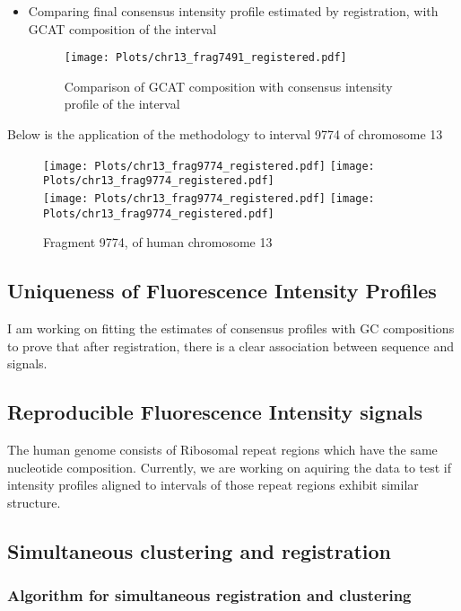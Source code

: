 \begin{itemize}
\item Comparing final consensus intensity profile estimated by registration, with GCAT composition of the interval
\begin{figure}[H]
\begin{center}
\texttt{[image: Plots/chr13\_frag7491\_registered.pdf]}
\end{center}
\caption{Comparison of GCAT composition with consensus intensity profile of the interval}
\label{fig:Frag7491_Compare}
\end{figure}
\end{itemize}

\newpage
Below is the application of the methodology to interval 9774 of chromosome 13
\begin{figure}[H]
\begin{center}
\texttt{[image: Plots/chr13\_frag9774\_registered.pdf]}
\texttt{[image: Plots/chr13\_frag9774\_registered.pdf]} \\
\texttt{[image: Plots/chr13\_frag9774\_registered.pdf]} 
\texttt{[image: Plots/chr13\_frag9774\_registered.pdf]}
\end{center}
\caption{Fragment 9774, of human chromosome 13}
\label{fig:Frag9774_All}
\end{figure}

\subsection{Uniqueness of Fluorescence Intensity Profiles}
\begin{tcolorbox}[colback=red!5,colframe=red!40!black,title=Work in progress] %
I am working on fitting the estimates of consensus profiles with GC compositions to prove that after registration, there is a clear association between sequence and signals. 
\end{tcolorbox}

\subsection{Reproducible Fluorescence Intensity signals}
\begin{tcolorbox}[colback=green!5,colframe=green!40!black,title=Work in progress] %
The human genome consists of Ribosomal repeat regions which have the same nucleotide composition. Currently, we are working on aquiring the data to test if intensity profiles aligned to intervals of those repeat regions exhibit similar structure.
\end{tcolorbox}


\subsection{Simultaneous clustering and registration}
\subsubsection*{Algorithm for simultaneous registration and clustering}



